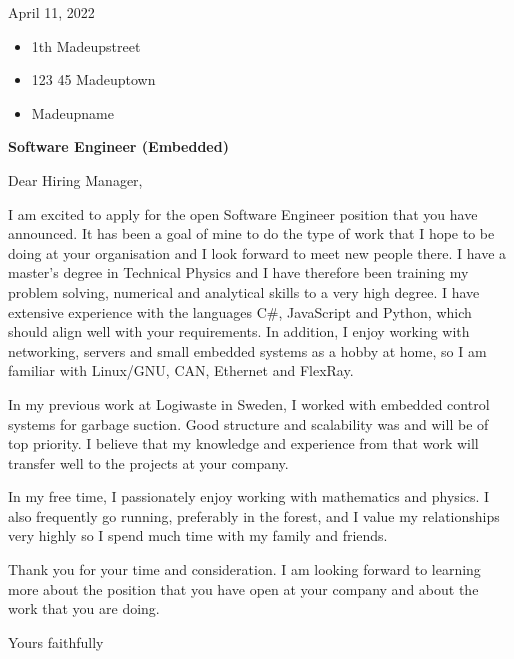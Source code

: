 April 11, 2022

\begin{itemize}
	\item 1th Madeupstreet
	\item 123 45 Madeuptown
	\item Madeupname
\end{itemize}

\bigskip

\textbf{Software Engineer (Embedded)}

Dear Hiring Manager,

I am excited to apply for the open Software Engineer position that you have announced. It has been a goal of mine to do the type of work that I hope to be doing at your organisation and I look forward to meet new people there. I have a master's degree in Technical Physics and I have therefore been training my problem solving, numerical and analytical skills to a very high degree. I have extensive experience with the languages C\#, JavaScript and Python, which should align well with your requirements. In addition, I enjoy working with networking, servers and small embedded systems as a hobby at home, so I am familiar with Linux/GNU, CAN, Ethernet and FlexRay.

In my previous work at Logiwaste in Sweden, I worked with embedded control systems for garbage suction. Good structure and scalability was and will be of top priority. I believe that my knowledge and experience from that work will transfer well to the projects at your company.

In my free time, I passionately enjoy working with mathematics and physics. I also frequently go running, preferably in the forest, and I value my relationships very highly so I spend much time with my family and friends.

Thank you for your time and consideration. I am looking forward to learning more about the position that you have open at your company and about the work that you are doing.

Yours faithfully



































